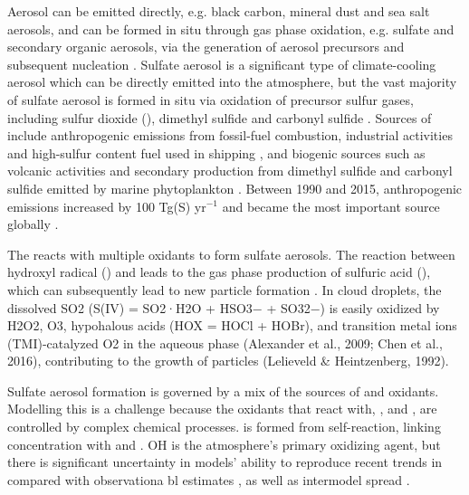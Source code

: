 Aerosol can be emitted directly, e.g. black carbon, mineral dust and sea salt aerosols, and can be formed in situ through gas phase oxidation, e.g. sulfate and secondary organic aerosols, via the generation of aerosol precursors and subsequent nucleation \citep{prosperoAtmosphericAerosolSystem1983}. Sulfate aerosol is a significant type of climate-cooling aerosol which can be directly emitted into the atmosphere, but the vast majority of sulfate aerosol is formed in situ via oxidation of precursor sulfur gases, including sulfur dioxide (), dimethyl sulfide and carbonyl sulfide \citep[e.g.][]{boucherGeneralCirculationModel1995, mulcahyDescriptionEvaluationAerosol2020}. Sources of  include anthropogenic emissions from fossil-fuel combustion, industrial activities and high-sulfur content fuel used in shipping \citep{hoeslyHistorical175020142018}, and biogenic sources such as volcanic activities and secondary production from dimethyl sulfide and carbonyl sulfide emitted by marine phytoplankton \citep{lanaUpdatedClimatologySurface2011}. Between 1990 and 2015, anthropogenic  emissions increased by 100 Tg(S) yr$^{-1}$ and became the most important source globally \citep{hoeslyHistorical175020142018, szopaShortlivedClimateForcers2021}.

The  reacts with multiple oxidants to form sulfate aerosols. The reaction between hydroxyl radical () and  leads to the gas phase production of sulfuric acid (), which can subsequently lead to new particle formation \citep{woodMechanismsAerosolFormation1975,mcmurryPhotochemicalAerosolFormation1980}. In cloud droplets, the dissolved SO2 (S(IV) = SO2·H2O + HSO3− + SO32−) is easily oxidized by H2O2, O3, hypohalous acids (HOX = HOCl + HOBr), and transition metal ions (TMI)-catalyzed O2 in the aqueous phase (Alexander et al., 2009; Chen et al., 2016), contributing to the growth of particles (Lelieveld \& Heintzenberg, 1992).


Sulfate aerosol formation is governed by a mix of the sources of  and oxidants. Modelling this is a challenge because the oxidants that  react with, ,  and , are controlled by complex chemical processes.   is formed from  self-reaction, linking  concentration with  and  \citep{allenH2O2CH3OOHMHP2022}. OH is the atmosphere's primary oxidizing agent, but there is significant uncertainty in models' ability to reproduce recent trends in  compared with observationa bl estimates \citep{stevensonTrendsGlobalTropospheric2020}, as well as intermodel spread \citep{zhaoIntermodelComparisonGlobal2019,zhaoRoleTrendVariability2020,murrayLargeUncertaintiesGlobal2021}.

